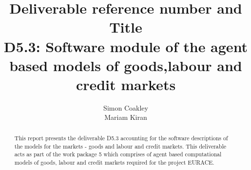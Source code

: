 \documentclass[12pt,a4paper]{report}
\begin{document}
\title{Deliverable reference number and Title\\
D5.3: Software module of the agent based models of goods,labour and credit markets}
\author{Simon Coakley\\Mariam Kiran}

\maketitle
\begin{abstract}


This report presents the deliverable D5.3 accounting for the software descriptions of the models for the markets - goods and labour and credit markets. This deliverable acts as part of the
work package 5 which comprises of agent based computational models of goods, labour and credit markets required for the project EURACE.


\end{abstract}



\tableofcontents \listoffigures \listoftables








%


\appendix

\label{cha_xmldtd} \small{{\tt }}
\end{document}
